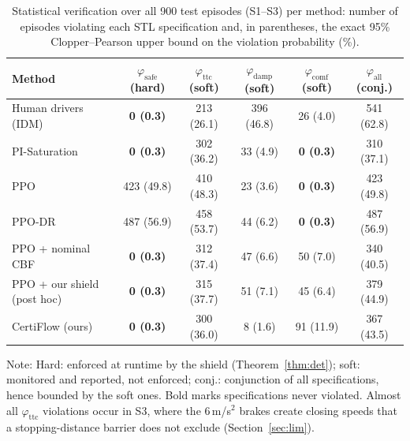 \begin{table}[!t]
\caption{Statistical verification over all 900 test episodes (S1--S3) per method: number of episodes violating each STL specification and, in parentheses, the exact 95\% Clopper--Pearson upper bound on the violation probability (\%).}\label{tab:verif}
\centering\footnotesize
\begin{tabular*}{\textwidth}{@{\extracolsep{\fill}}l ccccc@{}}
\toprule
Method & $\varphi_{\mathrm{safe}}$ (hard) & $\varphi_{\mathrm{ttc}}$ (soft) & $\varphi_{\mathrm{damp}}$ (soft) & $\varphi_{\mathrm{comf}}$ (soft) & $\varphi_{\mathrm{all}}$ (conj.)\\
\midrule
Human drivers (IDM) & \textbf{0 (0.3)} & 213 (26.1) & 396 (46.8) & 26 (4.0) & 541 (62.8)\\
PI-Saturation & \textbf{0 (0.3)} & 302 (36.2) & 33 (4.9) & \textbf{0 (0.3)} & 310 (37.1)\\
PPO & 423 (49.8) & 410 (48.3) & 23 (3.6) & \textbf{0 (0.3)} & 423 (49.8)\\
PPO-DR & 487 (56.9) & 458 (53.7) & 44 (6.2) & \textbf{0 (0.3)} & 487 (56.9)\\
PPO + nominal CBF & \textbf{0 (0.3)} & 312 (37.4) & 47 (6.6) & 50 (7.0) & 340 (40.5)\\
PPO + our shield (post hoc) & \textbf{0 (0.3)} & 315 (37.7) & 51 (7.1) & 45 (6.4) & 379 (44.9)\\
CertiFlow (ours) & \textbf{0 (0.3)} & 300 (36.0) & 8 (1.6) & 91 (11.9) & 367 (43.5)\\
\bottomrule
\end{tabular*}
\par\smallskip\raggedright\scriptsize Note: Hard: enforced at runtime by the shield (Theorem~\ref{thm:det}); soft: monitored and reported, not enforced; conj.: conjunction of all specifications, hence bounded by the soft ones. Bold marks specifications never violated. Almost all $\varphi_{\mathrm{ttc}}$ violations occur in S3, where the 6\,m/s$^2$ brakes create closing speeds that a stopping-distance barrier does not exclude (Section~\ref{sec:lim}).
\end{table}
